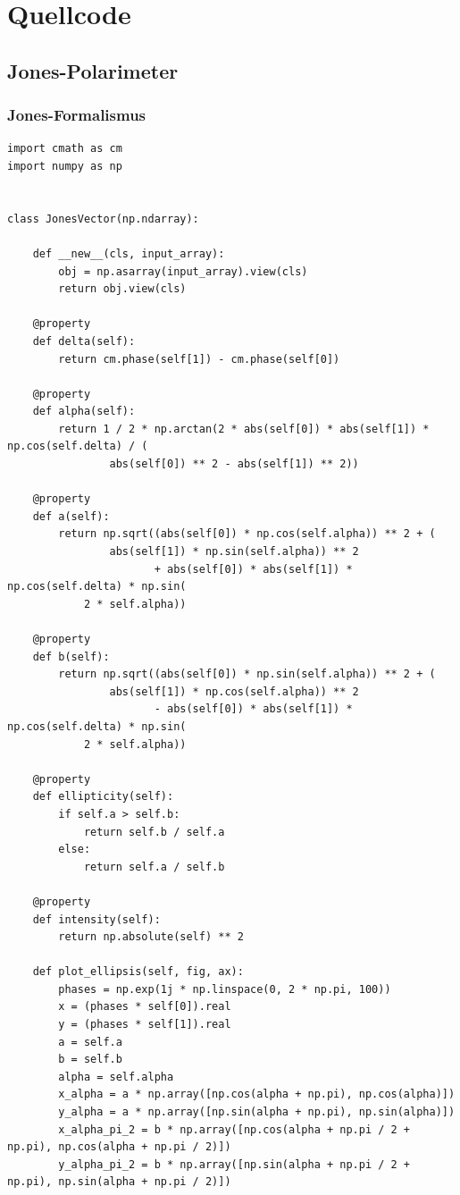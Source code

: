 \documentclass[a4paper, titlepage,  ngerman]{book}
\begin{document}
\FloatBarrier
\chapter{Quellcode}
\label{sec:source_code}
\section{Jones-Polarimeter}
\subsection{Jones-Formalismus}
\begin{verbatim}
import cmath as cm
import numpy as np


class JonesVector(np.ndarray):

    def __new__(cls, input_array):
        obj = np.asarray(input_array).view(cls)
        return obj.view(cls)

    @property
    def delta(self):
        return cm.phase(self[1]) - cm.phase(self[0])

    @property
    def alpha(self):
        return 1 / 2 * np.arctan(2 * abs(self[0]) * abs(self[1]) * np.cos(self.delta) / (
                abs(self[0]) ** 2 - abs(self[1]) ** 2))

    @property
    def a(self):
        return np.sqrt((abs(self[0]) * np.cos(self.alpha)) ** 2 + (
                abs(self[1]) * np.sin(self.alpha)) ** 2
                       + abs(self[0]) * abs(self[1]) * np.cos(self.delta) * np.sin(
            2 * self.alpha))

    @property
    def b(self):
        return np.sqrt((abs(self[0]) * np.sin(self.alpha)) ** 2 + (
                abs(self[1]) * np.cos(self.alpha)) ** 2
                       - abs(self[0]) * abs(self[1]) * np.cos(self.delta) * np.sin(
            2 * self.alpha))

    @property
    def ellipticity(self):
        if self.a > self.b:
            return self.b / self.a
        else:
            return self.a / self.b

    @property
    def intensity(self):
        return np.absolute(self) ** 2

    def plot_ellipsis(self, fig, ax):
        phases = np.exp(1j * np.linspace(0, 2 * np.pi, 100))
        x = (phases * self[0]).real
        y = (phases * self[1]).real
        a = self.a
        b = self.b
        alpha = self.alpha
        x_alpha = a * np.array([np.cos(alpha + np.pi), np.cos(alpha)])
        y_alpha = a * np.array([np.sin(alpha + np.pi), np.sin(alpha)])
        x_alpha_pi_2 = b * np.array([np.cos(alpha + np.pi / 2 + np.pi), np.cos(alpha + np.pi / 2)])
        y_alpha_pi_2 = b * np.array([np.sin(alpha + np.pi / 2 + np.pi), np.sin(alpha + np.pi / 2)])


\end{verbatim}
\end{document}
